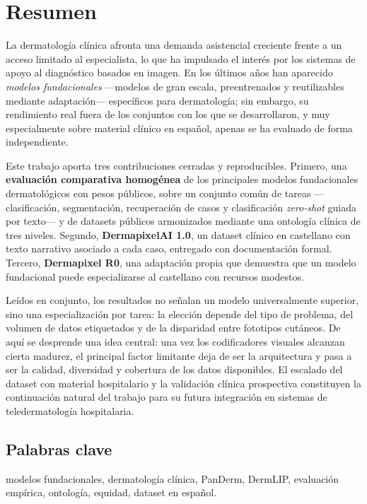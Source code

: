 
\chapter*{Resumen}
\vspace*{0.4cm}

La dermatología clínica afronta una demanda asistencial creciente frente a un acceso limitado al especialista, lo que ha impulsado el interés por los sistemas de apoyo al diagnóstico basados en imagen. En los últimos años han aparecido \emph{modelos fundacionales} ---modelos de gran escala, preentrenados y reutilizables mediante adaptación--- específicos para dermatología; sin embargo, su rendimiento real fuera de los conjuntos con los que se desarrollaron, y muy especialmente sobre material clínico en español, apenas se ha evaluado de forma independiente.
\par Este trabajo aporta tres contribuciones cerradas y reproducibles. Primero, una \textbf{evaluación comparativa homogénea} de los principales modelos fundacionales dermatológicos con pesos públicos, sobre un conjunto común de tareas ---clasificación, segmentación, recuperación de casos y clasificación \emph{zero-shot} guiada por texto--- y de datasets públicos armonizados mediante una ontología clínica de tres niveles. Segundo, \textbf{DermapixelAI 1.0}, un dataset clínico en castellano con texto narrativo asociado a cada caso, entregado con documentación formal. Tercero, \textbf{Dermapixel R0}, una adaptación propia que demuestra que un modelo fundacional puede especializarse al castellano con recursos modestos.
\par Leídos en conjunto, los resultados no señalan un modelo universalmente superior, sino una especialización por tarea: la elección depende del tipo de problema, del volumen de datos etiquetados y de la disparidad entre fototipos cutáneos. De aquí se desprende una idea central: una vez los codificadores visuales alcanzan cierta madurez, el principal factor limitante deja de ser la arquitectura y pasa a ser la calidad, diversidad y cobertura de los datos disponibles. El escalado del dataset con material hospitalario y la validación clínica prospectiva constituyen la continuación natural del trabajo para su futura integración en sistemas de teledermatología hospitalaria.

\vspace*{-0.4cm}
\section*{Palabras clave}
modelos fundacionales, dermatología clínica, PanDerm, DermLIP,
evaluación empírica, ontología, equidad, dataset en español.

